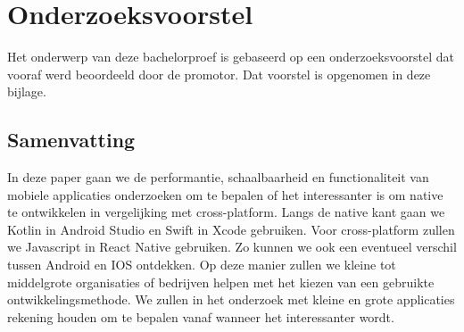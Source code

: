 \documentclass[dutch,dit,thesis]{hogentreport}
\begin{document}















\appendix

\chapter{Onderzoeksvoorstel}

Het onderwerp van deze bachelorproef is gebaseerd op een onderzoeksvoorstel dat vooraf werd beoordeeld door de 
promotor. Dat voorstel is opgenomen in deze bijlage.

\section*{Samenvatting}

In deze paper gaan we de performantie, schaalbaarheid en functionaliteit van mobiele applicaties onderzoeken 
om te bepalen of het interessanter is om native te ontwikkelen in vergelijking met cross-platform. Langs de 
native kant gaan we Kotlin in Android Studio en Swift in Xcode gebruiken. Voor cross-platform zullen we 
Javascript in React Native gebruiken. Zo kunnen we ook een eventueel verschil tussen Android en IOS ontdekken. 
Op deze manier zullen we kleine tot middelgrote organisaties of bedrijven helpen met het kiezen van een 
gebruikte ontwikkelingsmethode. We zullen in het onderzoek met kleine en grote applicaties rekening houden 
om te bepalen vanaf wanneer het interessanter wordt.



%


\backmatter{}

\setlength\bibitemsep{2pt} %
\printbibliography[heading=bibintoc]
\end{document}
